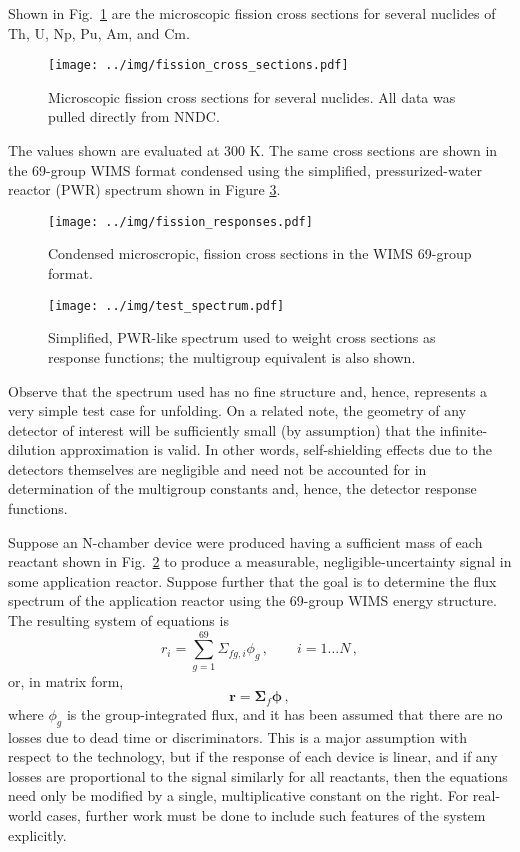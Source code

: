\documentclass[journal]{IEEEtran}
\newcommand{\FIG}[1]{Fig.~\ref{#1}}               %
\begin{document}
Shown in \FIG{fig:reactants} are the microscopic fission cross sections for several nuclides of Th, U, Np, Pu, Am, and Cm.  
\begin{figure}[h!tb]
  \centering
  \texttt{[image: ../img/fission\_cross\_sections.pdf]}
  \caption{Microscopic fission cross sections for several nuclides.  All data was pulled directly from NNDC\cite{nndc}.}
  \label{fig:reactants}
\end{figure}
The values shown are evaluated at 300 K.  The same cross sections are shown in the 69-group WIMS \cite{stammler1984methods} format condensed using the simplified, pressurized-water reactor (PWR)  spectrum shown in Figure \ref{fig:spectra}.  
\begin{figure}[h!tb]
  \centering
  \texttt{[image: ../img/fission\_responses.pdf]}
  \caption{Condensed microscropic, fission cross sections  in the WIMS 69-group format.}
  \label{fig:response}
\end{figure}
\begin{figure}[h!tb]
  \centering
  \texttt{[image: ../img/test\_spectrum.pdf]}
  \caption{Simplified, PWR-like spectrum used to weight cross sections as response functions; the multigroup equivalent is also shown.}
  \label{fig:spectra}
\end{figure}
Observe that the spectrum used has no fine structure and, hence, represents a very simple test case for unfolding.  On a related note, the geometry of any detector of interest will be sufficiently small (by assumption) that the infinite-dilution approximation is valid.  In other words, self-shielding effects due to the detectors themselves are negligible and need not be accounted for in determination of the multigroup constants and, hence, the detector response functions.

Suppose an N-chamber device were produced having a sufficient mass of each reactant shown in \FIG{fig:response} to produce a measurable, negligible-uncertainty signal in some application reactor.  Suppose further that the goal is to determine the flux spectrum of the application reactor using the 69-group WIMS energy structure.  The resulting system of equations is 
\begin{equation}
  r_i = \sum_{g=1}^{69} \Sigma_{fg,i}  \phi_g\, , 
    \qquad i = 1 \ldots N \, ,
\label{eq:response}
\end{equation}
or, in matrix form,
\begin{equation}
 \mathbf{r} = \bm{\Sigma}_f \bm{\phi} \, ,
\end{equation}
where $\phi_g$ is the group-integrated flux, and it has been assumed that there are no losses due to dead time or discriminators.   This is a major assumption with respect to the technology, but if the response of each device is linear, and if any losses are proportional to the signal similarly for all reactants, then the equations need only be modified by a single, multiplicative constant on the right.  For real-world cases, further work must be done to include such features of the system explicitly.
\end{document}
